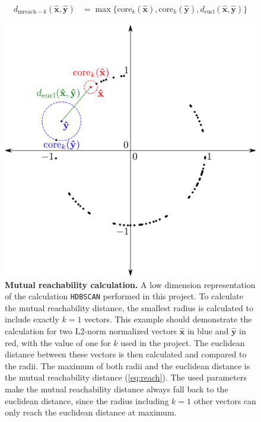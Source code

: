 \begin{equation}\label{eq:reach}
    \begin{aligned}
        d_{\text{mreach}-k}(\mathbf{\hat{x}},\mathbf{\hat{y}}) &= \max \{ \text{core}_k(\mathbf{\hat{x}}), \text{core}_k(\mathbf{\hat{y}}), d_{\text{eucl}}(\mathbf{\hat{x}},\mathbf{\hat{y}}) \}
    \end{aligned}
\end{equation}

\begin{figure}[!hbt]
    \centering
    \includegraphics[width=\textwidth]{Graphics/HDB.pdf}
    \caption[Mutual reachability calculation]{\textbf{Mutual reachability calculation.} A low dimension representation of the calculation \texttt{HDBSCAN} performed in this project. To calculate the mutual reachability distance, the smallest radius is calculated to include exactly $k = 1$ vectors. This example should demonstrate the calculation for two L2-norm normalized vectors $\mathbf{\hat{x}}$ in blue and $\mathbf{\hat{y}}$ in red, with the value of one for $k$ used in the project. The euclidean distance between these vectors is then calculated and compared to the radii. The maximum of both radii and the euclidean distance is the mutual reachability distance (\autoref{eq:reach}). The used parameters make the mutual reachability distance always fall back to the euclidean distance, since the radius including $k=1$ other vectors can only reach the euclidean distance at maximum.}
    \label{fig:HDB}
\end{figure}

